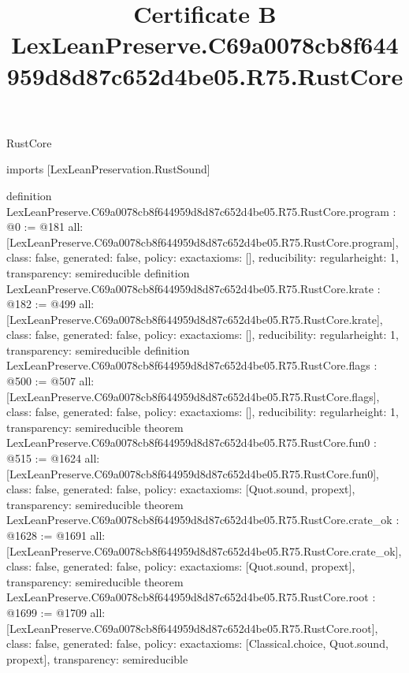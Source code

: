 \begin{lexlean}{RustCore}
\title{Certificate B LexLeanPreserve.C69a0078cb8f644959d8d87c652d4be05.R75.RustCore}
\begin{coremodule}
imports [LexLeanPreservation.RustSound]

definition LexLeanPreserve.C69a0078cb8f644959d8d87c652d4be05.R75.RustCore.program : @0 := @181 {
  all: [LexLeanPreserve.C69a0078cb8f644959d8d87c652d4be05.R75.RustCore.program],
  class: false,
  generated: false,
  policy: exact{axioms: []},
  reducibility: regular{height: 1},
  transparency: semireducible
}
definition LexLeanPreserve.C69a0078cb8f644959d8d87c652d4be05.R75.RustCore.krate : @182 := @499 {
  all: [LexLeanPreserve.C69a0078cb8f644959d8d87c652d4be05.R75.RustCore.krate],
  class: false,
  generated: false,
  policy: exact{axioms: []},
  reducibility: regular{height: 1},
  transparency: semireducible
}
definition LexLeanPreserve.C69a0078cb8f644959d8d87c652d4be05.R75.RustCore.flags : @500 := @507 {
  all: [LexLeanPreserve.C69a0078cb8f644959d8d87c652d4be05.R75.RustCore.flags],
  class: false,
  generated: false,
  policy: exact{axioms: []},
  reducibility: regular{height: 1},
  transparency: semireducible
}
theorem LexLeanPreserve.C69a0078cb8f644959d8d87c652d4be05.R75.RustCore.fun0 : @515 := @1624 {
  all: [LexLeanPreserve.C69a0078cb8f644959d8d87c652d4be05.R75.RustCore.fun0],
  class: false,
  generated: false,
  policy: exact{axioms: [Quot.sound, propext]},
  transparency: semireducible
}
theorem LexLeanPreserve.C69a0078cb8f644959d8d87c652d4be05.R75.RustCore.crate_ok : @1628 := @1691 {
  all: [LexLeanPreserve.C69a0078cb8f644959d8d87c652d4be05.R75.RustCore.crate_ok],
  class: false,
  generated: false,
  policy: exact{axioms: [Quot.sound, propext]},
  transparency: semireducible
}
theorem LexLeanPreserve.C69a0078cb8f644959d8d87c652d4be05.R75.RustCore.root : @1699 := @1709 {
  all: [LexLeanPreserve.C69a0078cb8f644959d8d87c652d4be05.R75.RustCore.root],
  class: false,
  generated: false,
  policy: exact{axioms: [Classical.choice, Quot.sound, propext]},
  transparency: semireducible
}


\end{coremodule}
\end{lexlean}
